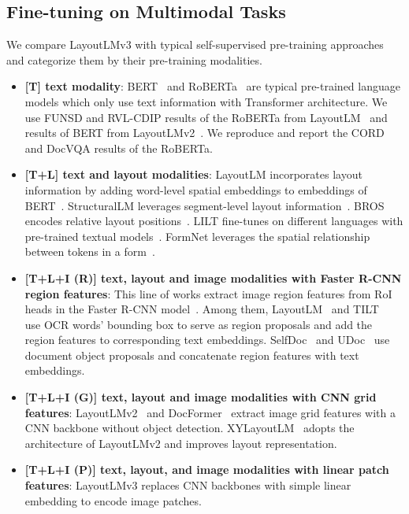 \documentclass[sigconf]{acmart}
\begin{document}
\subsection{Fine-tuning on Multimodal Tasks}
We compare LayoutLMv3 with typical self-supervised pre-training approaches and categorize them by their pre-training modalities.
\begin{itemize}
    \item \textbf{[T] text modality}: BERT~\cite{devlin2019bert} and RoBERTa~\cite{liu2019roberta} are typical pre-trained language models which only use text information with Transformer architecture. 
    We use FUNSD and RVL-CDIP results of the RoBERTa from LayoutLM~\cite{xu2020layoutlm} and results of BERT from LayoutLMv2~\cite{xu-etal-2021-layoutlmv2}. We reproduce and report the CORD and DocVQA results of the RoBERTa.
    \item \textbf{[T+L] text and layout modalities}: LayoutLM incorporates layout information by adding word-level spatial embeddings to embeddings of BERT~\cite{xu2020layoutlm}. StructuralLM leverages segment-level layout information~\cite{Li2021StructuralLMSP}. BROS encodes relative layout positions~\cite{hong2022bros}. LILT fine-tunes on different languages with pre-trained textual models~\cite{wang2022LiLT}.
    FormNet leverages the spatial relationship between tokens in a form~\cite{lee2022formnet}.
    \item \textbf{[T+L+I (R)] text, layout and image modalities with Faster R-CNN region features}: 
	This line of works extract image region features from RoI heads in the Faster R-CNN model~\cite{Ren2015FasterRT}. Among them, LayoutLM~\cite{xu2020layoutlm} and TILT~\cite{Powalski2021GoingFB} use OCR words' bounding box to serve as region proposals and add the region features to corresponding text embeddings.
	SelfDoc~\cite{li2021selfdoc} and UDoc~\cite{gu2021unidoc} use document object proposals and concatenate region features with text embeddings.
    \item \textbf{[T+L+I (G)] text, layout and image modalities with CNN grid features}: LayoutLMv2~\cite{xu-etal-2021-layoutlmv2} and DocFormer~\cite{Appalaraju_2021_ICCV} extract image grid features with a CNN backbone without object detection. XYLayoutLM~\cite{gu2022xylayoutlm} adopts the architecture of LayoutLMv2 and improves layout representation.
    \item \textbf{[T+L+I (P)] text, layout, and image modalities with linear patch features}: LayoutLMv3 replaces CNN backbones with simple linear embedding to encode image patches.
\end{itemize}
\end{document}
